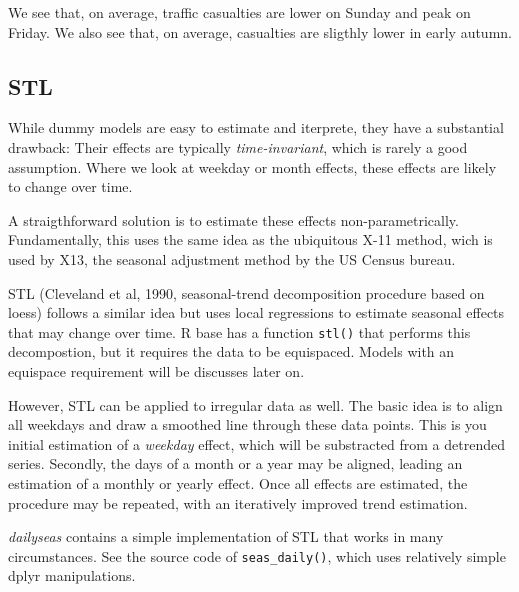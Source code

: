 We see that, on average, traffic casualties are lower on Sunday and peak
on Friday. We also see that, on average, casualties are sligthly lower
in early autumn.

\hypertarget{stl}{%
\subsection{STL}\label{stl}}

While dummy models are easy to estimate and iterprete, they have a
substantial drawback: Their effects are typically \emph{time-invariant},
which is rarely a good assumption. Where we look at weekday or month
effects, these effects are likely to change over time.

A straigthforward solution is to estimate these effects
non-parametrically. Fundamentally, this uses the same idea as the
ubiquitous X-11 method, wich is used by X13, the seasonal adjustment
method by the US Census bureau.

STL (Cleveland et al, 1990, seasonal-trend decomposition procedure based
on loess) follows a similar idea but uses local regressions to estimate
seasonal effects that may change over time. R base has a function
\texttt{stl()} that performs this decompostion, but it requires the data
to be equispaced. Models with an equispace requirement will be discusses
later on.

However, STL can be applied to irregular data as well. The basic idea is
to align all weekdays and draw a smoothed line through these data
points. This is you initial estimation of a \emph{weekday} effect, which
will be substracted from a detrended series. Secondly, the days of a
month or a year may be aligned, leading an estimation of a monthly or
yearly effect. Once all effects are estimated, the procedure may be
repeated, with an iteratively improved trend estimation.

\emph{dailyseas} contains a simple implementation of STL that works in
many circumstances. See the source code of \texttt{seas\_daily()}, which
uses relatively simple dplyr manipulations.

